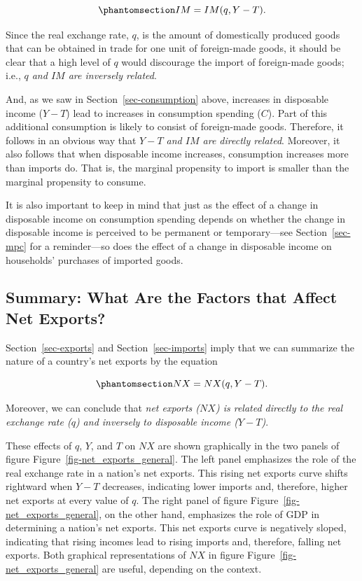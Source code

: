\documentclass[
  letterpaper,
]{book}
\theoremstyle{plain}
\theoremstyle{remark}
\begin{document}
\begin{equation}\phantomsection\label{eq-imports}{
IM=IM(q,Y-T).
}\end{equation}

Since the real exchange rate, \(q\), is the amount of domestically
produced goods that can be obtained in trade for one unit of
foreign-made goods, it should be clear that a high level of \(q\) would
discourage the import of foreign-made goods; i.e., \emph{\(q\) and
\(IM\) are inversely related}.

And, as we saw in Section~\ref{sec-consumption} above, increases in
disposable income (\(Y-T\)) lead to increases in consumption spending
(\(C\)). Part of this additional consumption is likely to consist of
foreign-made goods. Therefore, it follows in an obvious way that
\emph{\(Y-T\) and \(IM\) are directly related}. Moreover, it also
follows that when disposable income increases, consumption increases
more than imports do. That is, the marginal propensity to import is
smaller than the marginal propensity to consume.

It is also important to keep in mind that just as the effect of a change
in disposable income on consumption spending depends on whether the
change in disposable income is perceived to be permanent or
temporary---see Section~\ref{sec-mpc} for a reminder---so does the
effect of a change in disposable income on households' purchases of
imported goods.

\subsection{Summary: What Are the Factors that Affect Net
Exports?}\label{sec-summary-nxp}

Section~\ref{sec-exports} and Section~\ref{sec-imports} imply that we
can summarize the nature of a country's net exports by the equation

\begin{equation}\phantomsection\label{eq-netexports}{
NX=NX(q,Y-T).
}\end{equation}

Moreover, we can conclude that \emph{net exports (\(NX\)) is related
directly to the real exchange rate (\(q\)) and inversely to disposable
income (\(Y-T\))}.

These effects of \(q\), \(Y\), and \(T\) on \(NX\) are shown graphically
in the two panels of figure Figure~\ref{fig-net_exports_general}. The
left panel emphasizes the role of the real exchange rate in a nation's
net exports. This rising net exports curve shifts rightward when \(Y-T\)
decreases, indicating lower imports and, therefore, higher net exports
at every value of \(q\). The right panel of figure
Figure~\ref{fig-net_exports_general}, on the other hand, emphasizes the
role of GDP in determining a nation's net exports. This net exports
curve is negatively sloped, indicating that rising incomes lead to
rising imports and, therefore, falling net exports. Both graphical
representations of \(NX\) in figure Figure~\ref{fig-net_exports_general}
are useful, depending on the context.
\end{document}
